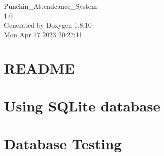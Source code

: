 \documentclass[twoside]{book}
\newcommand{\+}{\discretionary{\mbox{\scriptsize$\hookleftarrow$}}{}{}}
\newcommand{\clearemptydoublepage}{%
  \newpage{\pagestyle{empty}\cleardoublepage}%
}
\begin{document}
\hypersetup{pageanchor=false,
             bookmarks=true,
             bookmarksnumbered=true,
             pdfencoding=unicode
            }
\begin{titlepage}
\vspace*{7cm}
\begin{center}%
{\Large Punchin\+\_\+\+Attendcance\+\_\+\+System \\[1ex]\large 1.\+0 }\\
\vspace*{1cm}
{\large Generated by Doxygen 1.8.10}\\
\vspace*{0.5cm}
{\small Mon Apr 17 2023 20:27:11}\\
\end{center}
\end{titlepage}
\clearemptydoublepage
\tableofcontents
\clearemptydoublepage
{}
\hypersetup{pageanchor=true}

\chapter{R\+E\+A\+D\+M\+E}
\label{md__e_1__glasgow__course__works__realtime__embeded__programming__project_files__course_project__f091911a8a8d7f8977ecbc1b1bf9ebf1}
\hypertarget{md__e_1__glasgow__course__works__realtime__embeded__programming__project_files__course_project__f091911a8a8d7f8977ecbc1b1bf9ebf1}{}

\chapter{Using S\+Q\+Lite database}
\label{md__e_1__glasgow__course__works__realtime__embeded__programming__project_files__course_project__5ee08937d0a7186678f6e37cf1d79786}
\hypertarget{md__e_1__glasgow__course__works__realtime__embeded__programming__project_files__course_project__5ee08937d0a7186678f6e37cf1d79786}{}

\chapter{Database Testing}
\label{md__e_1__glasgow__course__works__realtime__embeded__programming__project_files__course_project__b1352d526c9480618cacf9c4066be3ad}
\hypertarget{md__e_1__glasgow__course__works__realtime__embeded__programming__project_files__course_project__b1352d526c9480618cacf9c4066be3ad}{}

\end{document}
